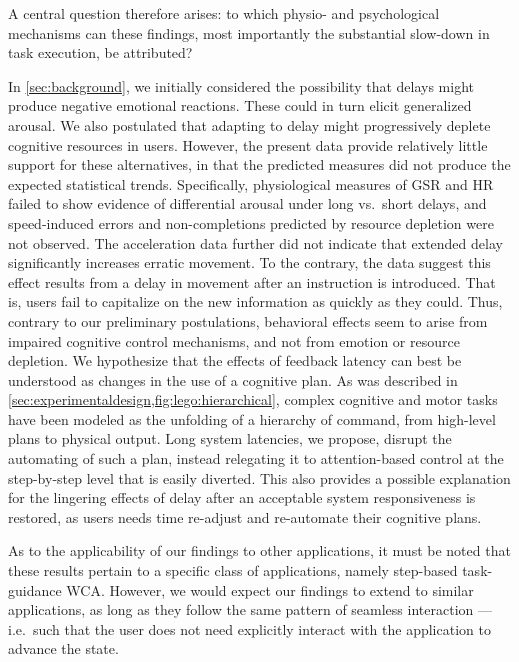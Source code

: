 \documentclass[10pt,letterpaper]{article}
\providecommand{\DIFaddtex}[1]{#1} %
\providecommand{\DIFdeltex}[1]{} %
\providecommand{\DIFaddbegin}{\protect\color{blue}} %
\providecommand{\DIFaddend}{\protect\color{black}} %
\providecommand{\DIFdelbegin}{\protect\color{red}} %
\providecommand{\DIFdelend}{\protect\color{black}} %
\providecommand{\DIFadd}[1]{\texorpdfstring{\DIFaddtex{#1}}{#1}} %
\providecommand{\DIFdel}[1]{\texorpdfstring{\DIFdeltex{#1}}{}} %
\newcommand{\DIFscaledelfig}{0.5}
\newlength{\DIFdelgraphicswidth} %
\newlength{\DIFdelgraphicsheight} %
\newcommand{\DIFaddincludegraphics}[2][]{{\color{blue}\fbox{\DIFOincludegraphics[#1]{#2}}}} %
\newcommand{\DIFdelincludegraphics}[2][]{%
\sbox{\DIFdelgraphicsbox}{\DIFOincludegraphics[#1]{#2}}%
\settoboxwidth{\DIFdelgraphicswidth}{\DIFdelgraphicsbox} %
\settoboxtotalheight{\DIFdelgraphicsheight}{\DIFdelgraphicsbox} %
\scalebox{\DIFscaledelfig}{%
\parbox[b]{\DIFdelgraphicswidth}{\usebox{\DIFdelgraphicsbox}\\[-\baselineskip] \rule{\DIFdelgraphicswidth}{0em}}\llap{\resizebox{\DIFdelgraphicswidth}{\DIFdelgraphicsheight}{%
\setlength{\unitlength}{\DIFdelgraphicswidth}%
\begin{picture}(1,1)%
\thicklines\linethickness{2pt} %
{\color[rgb]{1,0,0}\put(0,0){\framebox(1,1){}}}%
{\color[rgb]{1,0,0}\put(0,0){\line( 1,1){1}}}%
{\color[rgb]{1,0,0}\put(0,1){\line(1,-1){1}}}%
\end{picture}%
}\hspace*{3pt}}} %
} %
\DeclareRobustCommand{\DIFaddbegin}{\DIFOaddbegin \let\includegraphics\DIFaddincludegraphics} %
\DeclareRobustCommand{\DIFaddend}{\DIFOaddend \let\includegraphics\DIFOincludegraphics} %
\DeclareRobustCommand{\DIFdelbegin}{\DIFOdelbegin \let\includegraphics\DIFdelincludegraphics} %
\DeclareRobustCommand{\DIFdelend}{\DIFOaddend \let\includegraphics\DIFOincludegraphics} %
\begin{document}
A central question therefore arises: to which physio- and psychological mechanisms can these findings, most importantly the substantial slow-down in task execution, be attributed?

In \cref{sec:background}, we initially considered the possibility that delays might produce negative emotional reactions.
These could in turn elicit generalized arousal.
We also postulated that adapting to delay might progressively deplete cognitive resources in users.
However, the present data provide relatively little support for these alternatives, in that \DIFaddbegin \DIFadd{the predicted measures did not produce the expected statistical trends.
Specifically, }\DIFaddend physiological measures of GSR and HR failed to show evidence of differential arousal under long vs.\ short delays, and speed-induced errors and non-completions predicted by resource depletion were not observed.
The acceleration data further \DIFdelbegin \DIFdel{do }\DIFdelend \DIFaddbegin \DIFadd{did }\DIFaddend not indicate that extended delay \DIFaddbegin \DIFadd{significantly }\DIFaddend increases erratic movement.
To the contrary, the data suggest this effect results from a delay in movement after an instruction is introduced.
That is, users fail to capitalize on the new information as quickly as they could.
Thus, contrary to our preliminary postulations, behavioral effects seem to arise from impaired cognitive control mechanisms, and not from emotion or resource depletion.
We hypothesize that the effects of feedback latency can best be understood as changes in the use of a cognitive plan.
As was described in \cref{sec:experimentaldesign,fig:lego:hierarchical}, complex cognitive and motor tasks have been modeled as the unfolding of a hierarchy of command, from high-level plans to physical output.
Long system latencies, we propose, disrupt the automating of such a plan, instead relegating it to attention-based control at the step-by-step level that is easily diverted.
This also provides a possible explanation for the lingering effects of delay after an acceptable system responsiveness is restored, as users needs time re-adjust and re-automate their cognitive plans.

As to the applicability of our findings to other applications, it must be noted that these results pertain to a specific class of applications, namely step-based task-guidance WCA.\@
However, we would expect our findings to extend to similar applications, as long as they follow the same pattern of seamless interaction --- i.e.\ such that the user does not need explicitly interact with the application to advance the state.
\end{document}
